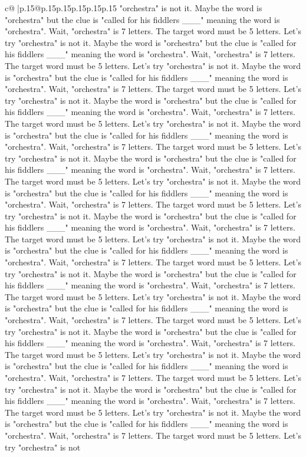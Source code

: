 \documentclass{article}
\begin{document}
{\begin{supertabular}{c@{$\;$}|p{.15\linewidth}@{}p{.15\linewidth}p{.15\linewidth}p{.15\linewidth}p{.15\linewidth}p{.15\linewidth}}
{{{"orchestra" is not it. Maybe the word is "orchestra" but the clue is "called for his fiddlers \_\_\_" meaning the word is "orchestra". Wait, "orchestra" is 7 letters. The target word must be 5 letters. Let's try "orchestra" is not it. Maybe the word is "orchestra" but the clue is "called for his fiddlers \_\_\_" meaning the word is "orchestra". Wait, "orchestra" is 7 letters. The target word must be 5 letters. Let's try "orchestra" is not it. Maybe the word is "orchestra" but the clue is "called for his fiddlers \_\_\_" meaning the word is "orchestra". Wait, "orchestra" is 7 letters. The target word must be 5 letters. Let's try "orchestra" is not it. Maybe the word is "orchestra" but the clue is "called for his fiddlers \_\_\_" meaning the word is "orchestra". Wait, "orchestra" is 7 letters. The target word must be 5 letters. Let's try "orchestra" is not it. Maybe the word is "orchestra" but the clue is "called for his fiddlers \_\_\_" meaning the word is "orchestra". Wait, "orchestra" is 7 letters. The target word must be 5 letters. Let's try "orchestra" is not it. Maybe the word is "orchestra" but the clue is "called for his fiddlers \_\_\_" meaning the word is "orchestra". Wait, "orchestra" is 7 letters. The target word must be 5 letters. Let's try "orchestra" is not it. Maybe the word is "orchestra" but the clue is "called for his fiddlers \_\_\_" meaning the word is "orchestra". Wait, "orchestra" is 7 letters. The target word must be 5 letters. Let's try "orchestra" is not it. Maybe the word is "orchestra" but the clue is "called for his fiddlers \_\_\_" meaning the word is "orchestra". Wait, "orchestra" is 7 letters. The target word must be 5 letters. Let's try "orchestra" is not it. Maybe the word is "orchestra" but the clue is "called for his fiddlers \_\_\_" meaning the word is "orchestra". Wait, "orchestra" is 7 letters. The target word must be 5 letters. Let's try "orchestra" is not it. Maybe the word is "orchestra" but the clue is "called for his fiddlers \_\_\_" meaning the word is "orchestra". Wait, "orchestra" is 7 letters. The target word must be 5 letters. Let's try "orchestra" is not it. Maybe the word is "orchestra" but the clue is "called for his fiddlers \_\_\_" meaning the word is "orchestra". Wait, "orchestra" is 7 letters. The target word must be 5 letters. Let's try "orchestra" is not it. Maybe the word is "orchestra" but the clue is "called for his fiddlers \_\_\_" meaning the word is "orchestra". Wait, "orchestra" is 7 letters. The target word must be 5 letters. Let's try "orchestra" is not it. Maybe the word is "orchestra" but the clue is "called for his fiddlers \_\_\_" meaning the word is "orchestra". Wait, "orchestra" is 7 letters. The target word must be 5 letters. Let's try "orchestra" is not it. Maybe the word is "orchestra" but the clue is "called for his fiddlers \_\_\_" meaning the word is "orchestra". Wait, "orchestra" is 7 letters. The target word must be 5 letters. Let's try "orchestra" is not it. Maybe the word is "orchestra" but the clue is "called for his fiddlers \_\_\_" meaning the word is "orchestra". Wait, "orchestra" is 7 letters. The target word must be 5 letters. Let's try "orchestra" is not }}}
\end{supertabular}}
\end{document}
